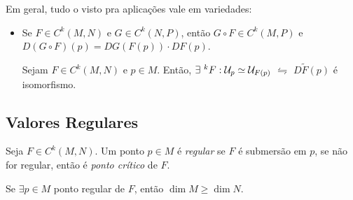 \begin{note}
    Em geral, tudo o visto pra aplicações vale em variedades: 
    \begin{itemize}[left = -0.5cm]
    \item[] \vspace{-1cm}\begin{theorem}
         Se \(F\in C^k(M,N)\) e \(G \in C^k(N,P)\), então \(G \circ F \in C^k(M,P)\) e \(D(G\circ F)(p)  = DG(F(p))\cdot DF(p)\). 
    \end{theorem}
    \hypertarget{thmTFIV2}{}
    \begin{theorem} 
        Sejam \(F\in C^k(M,N)\) e \(p \in M\). Então, \(\exists \ ^k F : \mathcal{U}_p \simeq \mathcal{U}_{F(p)}\) \(\leftrightharpoons\) \(D\widetilde{F}(p)\) é isomorfismo.  
    \end{theorem}
    \end{itemize}
\end{note}

\subsection*{Valores Regulares}

\begin{definition}
    Seja \(F \in C^k(M,N)\). Um ponto \(p\in M\) é \emph{regular} se \(F\) é submersão em \(p\), se não for regular, então é \emph{ponto crítico} de \(F\).  
\end{definition}

\begin{note}
    Se \(\exists p\in M\) ponto regular de \(F\), então \(\dim M \geq \dim N\).
\end{note}



